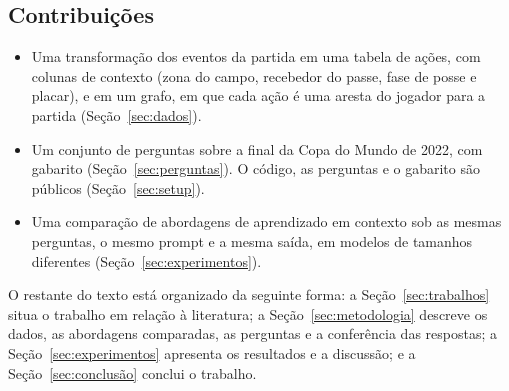 
\subsection{Contribuições}\label{sec:contribuições}

\begin{itemize}
\item Uma transformação dos eventos da partida em uma tabela de ações, com colunas de contexto (zona do campo,
recebedor do passe, fase de posse e placar), e em um grafo, em que cada ação é uma aresta do jogador para a
partida (Seção~\ref{sec:dados}).
\item Um conjunto de \nQuestions{} perguntas sobre a final da Copa do Mundo de 2022, com gabarito
(Seção~\ref{sec:perguntas}).
O código, as perguntas e o gabarito são públicos (Seção~\ref{sec:setup}).
\item Uma comparação de \nArms{} abordagens de aprendizado em contexto sob as mesmas perguntas, o mesmo prompt e
a mesma saída, em \nModels{} modelos de tamanhos diferentes (Seção~\ref{sec:experimentos}).
\end{itemize}

O restante do texto está organizado da seguinte forma: a Seção~\ref{sec:trabalhos} situa o trabalho em relação
à literatura; a Seção~\ref{sec:metodologia} descreve os dados, as abordagens comparadas, as perguntas e a
conferência das respostas; a Seção~\ref{sec:experimentos} apresenta os resultados e a discussão; e a
Seção~\ref{sec:conclusão} conclui o trabalho.
